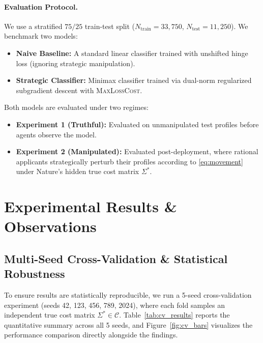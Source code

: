 \documentclass[10pt, letterpaper]{article}
\newcommand{\C}{\mathcal{C}}
\begin{document}
\paragraph{Evaluation Protocol.} We use a stratified $75/25$ train-test split ($N_{\text{train}} = 33{,}750$, $N_{\text{test}} = 11{,}250$). We benchmark two models:
\begin{itemize}[leftmargin=*]
    \item \textbf{Naive Baseline:} A standard linear classifier trained with unshifted hinge loss (ignoring strategic manipulation).
    \item \textbf{Strategic Classifier:} Minimax classifier trained via dual-norm regularized subgradient descent with \textsc{MaxLossCost}.
\end{itemize}
Both models are evaluated under two regimes:
\begin{itemize}[leftmargin=*]
    \item \textbf{Experiment 1 (Truthful):} Evaluated on unmanipulated test profiles before agents observe the model.
    \item \textbf{Experiment 2 (Manipulated):} Evaluated post-deployment, where rational applicants strategically perturb their profiles according to \eqref{eq:movement} under Nature's hidden true cost matrix $\Sigma^*$.
\end{itemize}

\section{Experimental Results \& Observations}
\label{sec:results}

\subsection{Multi-Seed Cross-Validation & Statistical Robustness}
\label{sec:pillar1}

To ensure results are statistically reproducible, we run a 5-seed cross-validation experiment (seeds 42, 123, 456, 789, 2024), where each fold samples an independent true cost matrix $\Sigma^* \in \C$. Table~\ref{tab:cv_results} reports the quantitative summary across all 5 seeds, and Figure~\ref{fig:cv_bars} visualizes the performance comparison directly alongside the findings.
\end{document}
